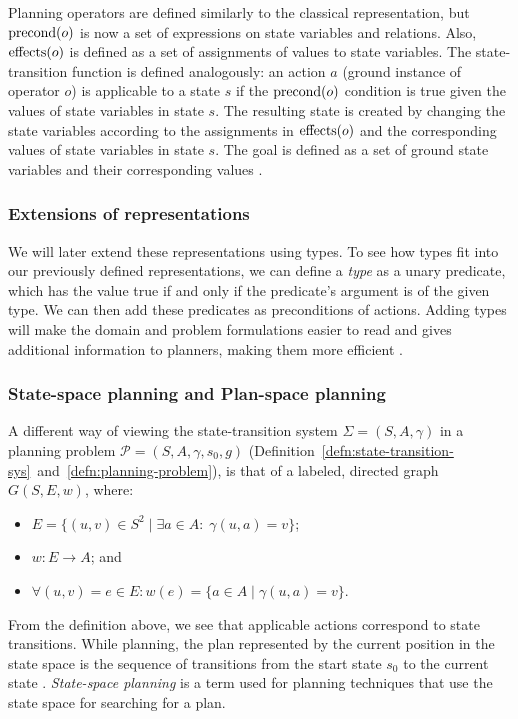 Planning operators are defined similarly to the classical representation, but
$\operatorname{\textrm{precond}}(o)$ is now a set of expressions on state variables and relations.
Also, $\operatorname{\textrm{effects}}(o)$ is defined as a set of assignments of values to state variables.
The state-transition function is defined analogously: an action $a$ (ground instance
of operator $o$)
is applicable to a state $s$ if the $\operatorname{\textrm{precond}}(o)$ condition is true given the values
of state variables in state $s$. The resulting state is created by changing the state variables
according to the assignments in $\operatorname{\textrm{effects}}(o)$ and the corresponding values of state
variables in state $s$.
The goal is defined as a set of ground state variables and their corresponding values
\citep[Section~2.5.2]{Ghallab2004}.


\subsubsection{Extensions of representations}

We will later extend these representations using types.
To see how types fit into our previously defined representations, we can
define a \textit{type} as a unary predicate, which has the value true
if and only if the predicate's argument is of the given type.
We can then add these predicates as preconditions of actions.
Adding types will make the domain and problem formulations
easier to read and gives additional information
to planners, making them more efficient \citep[Section 2.4.1]{Ghallab2004}.

\subsubsection{State-space planning and Plan-space planning}

A different way of viewing the state-transition system $\Sigma = (S, A, \gamma)$ in a
planning problem $\mathcal{P} = (S, A, \gamma, s_0, g)$ (Definition~\ref{defn:state-transition-sys}~and~\ref{defn:planning-problem}), is that of a labeled, directed graph $G(S, E, w)$, where:
\begin{itemize}
\item $E = \{(u, v) \in S^2 \;|\; \exists a \in A : \; \gamma(u, a) = v\}$;
\item $w: E \to A$; and
\item $\forall (u, v) = e \in E : w(e) = \{a \in A \;|\; \gamma(u, a) = v\}$. 
\end{itemize}
From the definition above, we see that applicable actions correspond to state transitions. While planning, the plan represented by the current position in
the state space is the sequence of transitions from the start
state $s_0$ to the current state \citep[Section~4.1]{Ghallab2004}.
\textit{State-space planning} is a term used for planning techniques
that use the state space for searching for a plan.

